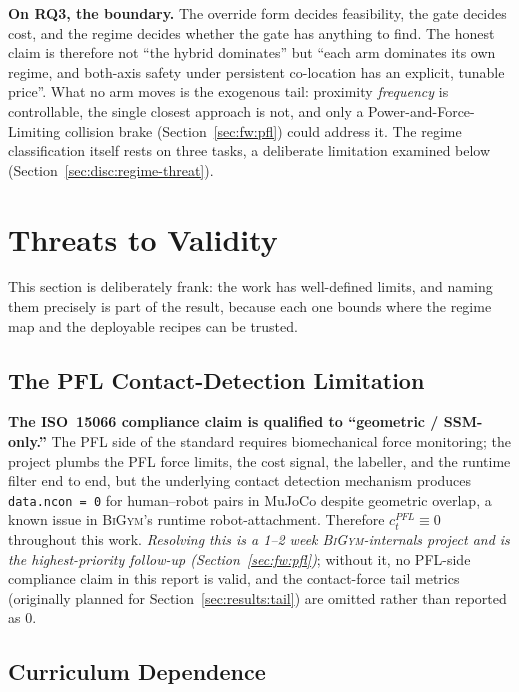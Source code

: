 \documentclass[11pt,a4paper]{report}
\newcommand{\ssm}{SSM}
\newcommand{\pfl}{PFL}
\newcommand{\iso}{ISO~15066}
\newcommand{\bigym}{\textsc{BiGym}}
\begin{document}
\textbf{On RQ3, the boundary.} The override form decides
feasibility, the gate decides cost, and the regime decides whether
the gate has anything to find. The honest claim is therefore not
``the hybrid dominates'' but ``each arm dominates its own regime,
and both-axis safety under persistent co-location has an explicit,
tunable price''. What no arm moves is the exogenous tail: proximity
\emph{frequency} is controllable, the single closest approach is
not, and only a Power-and-Force-Limiting collision brake
(Section~\ref{sec:fw:pfl}) could address it. The regime
classification itself rests on three tasks, a deliberate limitation
examined below (Section~\ref{sec:disc:regime-threat}).

\section{Threats to Validity}
\label{sec:disc:threats}

This section is deliberately frank: the work has well-defined
limits, and naming them precisely is part of the result, because
each one bounds where the regime map and the deployable recipes can
be trusted.

\subsection{The \pfl{} Contact-Detection Limitation}
\label{sec:disc:pfl-bug}

\textbf{The \iso{} compliance claim is qualified to ``geometric /
\ssm{}-only.''} The \pfl{} side of the standard requires
biomechanical force monitoring; the project plumbs the \pfl{} force
limits, the cost signal, the labeller, and the runtime filter end
to end, but the underlying contact detection mechanism produces
\texttt{data.ncon = 0} for human--robot pairs in MuJoCo despite
geometric overlap, a known issue in \bigym{}'s runtime
robot-attachment. Therefore $c^{\pfl}_t \equiv 0$ throughout this
work. \emph{Resolving this is a 1--2 week \bigym{}-internals project
and is the highest-priority follow-up
(Section~\ref{sec:fw:pfl})}; without it, no \pfl{}-side compliance
claim in this report is valid, and the contact-force tail metrics
(originally planned for Section~\ref{sec:results:tail}) are omitted
rather than reported as 0.

\subsection{Curriculum Dependence}
\label{sec:disc:curriculum}
\end{document}
